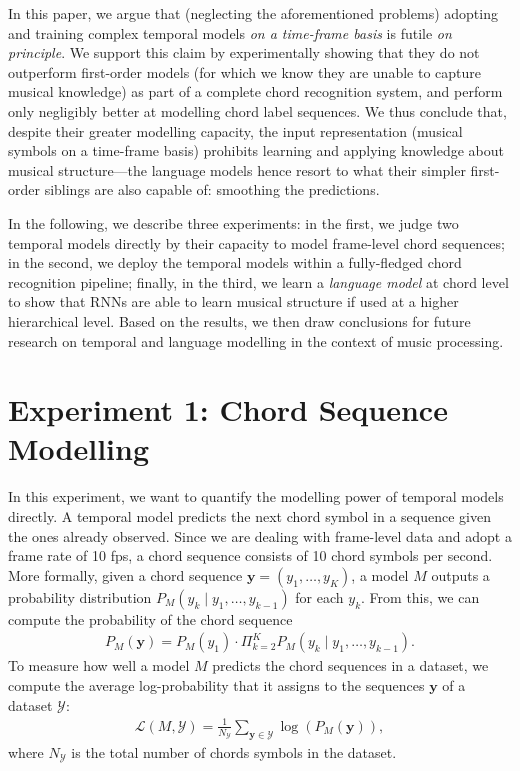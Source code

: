 \documentclass[twocolumn]{article}
\newcommand{\y}{\bm{y}}
\newcommand{\Y}{\mathcal{Y}}
\renewcommand{\L}{\mathcal{L}}
\begin{document}
In this paper, we argue that (neglecting the aforementioned problems) adopting
and training complex temporal models \emph{on a time-frame basis} is futile
\emph{on principle}. We support this claim by experimentally showing that they
do not outperform first-order models (for which we know they are unable to
capture musical knowledge) as part of a complete chord recognition system, and
perform only negligibly better at modelling chord label sequences. We thus
conclude that, despite their greater modelling capacity, the input
representation (musical symbols on a time-frame basis) prohibits learning and
applying knowledge about musical structure---the language models hence resort
to what their simpler first-order siblings are also capable of: smoothing the
predictions.

In the following, we describe three experiments: in the first, we judge two
temporal models directly by their capacity to model frame-level chord
sequences; in the second, we deploy the temporal models within a fully-fledged
chord recognition pipeline; finally, in the third, we learn a \emph{language
model} at chord level to show that RNNs are able to learn musical structure if
used at a higher hierarchical level. Based on the results, we then draw
conclusions for future research on temporal and language modelling in the
context of music processing.

\section{Experiment 1: Chord Sequence Modelling}

In this experiment, we want to quantify the modelling power of temporal models
directly. A temporal model predicts the next chord symbol in a sequence given
the ones already observed. Since we are dealing with frame-level data and adopt
a frame rate of 10 fps, a chord sequence consists of 10 chord symbols per
second. More formally, given a chord sequence $\y = (y_1,\ldots,y_{K})$, a
model $M$ outputs a probability distribution $P_M(y_k \mid y_1,\ldots,y_{k-1})$
for each $y_k$. From this, we can compute the probability of the chord sequence
\begin{align}
P_M\left(\y\right) = P_M(y_1) \cdot \Pi_{k=2}^{K} P_M\left(y_k \mid y_1, \ldots, y_{k - 1}\right).
\label{eq:seq_prod}
\end{align}
To measure how well a model $M$ predicts the chord sequences in a dataset, we
compute the average log-probability that it assigns to the sequences $\y$ of a
dataset $\Y$:
\begin{align}
        \L(M,\Y) = \frac{1}{N_\Y} \sum_{\y \in \Y} \log\left(P_M\left(\y\right)\right),
\end{align}
where $N_\Y$ is the total number of chords symbols in the dataset.
\end{document}

